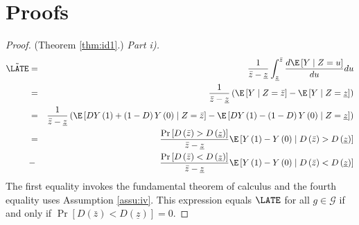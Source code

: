 \section{Proofs}
\begin{proof}
(Theorem \ref{thm:id1}.) \emph{Part i).}
\begin{eqnarray*}
\tilde{\LATE} & = & \frac{1}{\bar{z}-\underline{z}}\int_{\underline{z}}^{\bar{z}}\frac{d\E\left[Y\mid Z=u\right]}{du}du\\
 & = & \frac{1}{\bar{z}-\underline{z}}\left(\E\left[Y\mid Z=\bar{z}\right]-\E\left[Y\mid Z=\underline{z}\right]\right)\\
 & = & \frac{1}{\bar{z}-\underline{z}}\left(\E\left[DY\left(1\right)+\left(1-D\right)Y\left(0\right)\mid Z=\bar{z}\right]-\E\left[DY\left(1\right)-\left(1-D\right)Y\left(0\right)\mid Z=\underline{z}\right]\right)\\
 & = & \frac{\Pr\left[D\left(\bar{z}\right)>D\left(\underline{z}\right)\right]}{\bar{z}-\underline{z}}\E\left[Y\left(1\right)-Y\left(0\right)\mid D\left(\bar{z}\right)>D\left(\underline{z}\right)\right]\\
 & - & \frac{\Pr\left[D\left(\bar{z}\right)<D\left(\underline{z}\right)\right]}{\bar{z}-\underline{z}}\E\left[Y\left(1\right)-Y\left(0\right)\mid D\left(\bar{z}\right)<D\left(\underline{z}\right)\right]
\end{eqnarray*}
The first equality invokes the fundamental theorem of calculus and
the fourth equality uses Assumption \ref{assu:iv}. This expression
equals $\LATE$ for all $g\in\mathcal{G}$ if and only if $\Pr\left[D\left(\bar{z}\right)<D\left(\underline{z}\right)\right]=0$.


\end{proof}
